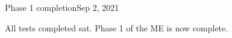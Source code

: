 \begin{entry}{Phase 1 completion}{Sep 2, 2021}
    \results
    
    All tests completed sat. Phase 1 of the ME is now complete.


\end{entry}


%
%
%
%
%
%
%
%
%
%
%
%
%
